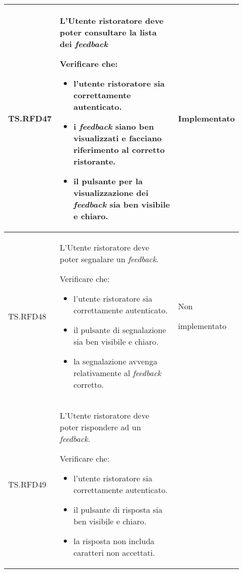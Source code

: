 \begin{longtable}{|p{0.10\linewidth}|p{0.70\linewidth}|p{0.12\linewidth}|}
	\hline
	TS.RFD47                                                                                                                        &
	L'Utente ristoratore deve poter consultare la lista dei \textit{feedback} \par
	Verificare che:
	\begin{itemize}
		\item l'utente ristoratore sia correttamente autenticato.
		\item i \textit{feedback} siano ben visualizzati e facciano riferimento al corretto ristorante.
		\item il pulsante per la visualizzazione dei \textit{feedback} sia ben visibile e chiaro.
	\end{itemize}                                 &
	Implementato                                                                                                                                                   \\
	\hline
	TS.RFD48                                                                                                                        &
	L'Utente ristoratore deve poter segnalare un \textit{feedback}. \par
	Verificare che:
	\begin{itemize}
		\item l'utente ristoratore sia correttamente autenticato.
		\item il pulsante di segnalazione sia ben visibile e chiaro.
		\item la segnalazione avvenga relativamente al \textit{feedback} corretto.
	\end{itemize}                                                   &
	Non \par implementato                                                                                                                                                   \\
	\hline
	TS.RFD49                                                                                                                        &
	L'Utente ristoratore deve poter rispondere ad un \textit{feedback}. \par
	Verificare che:
	\begin{itemize}
		\item l'utente ristoratore sia correttamente autenticato.
		\item il pulsante di risposta sia ben visibile e chiaro.
		\item la risposta non includa caratteri non accettati.

\end{itemize}
\end{longtable}
